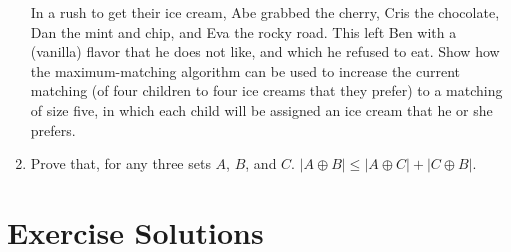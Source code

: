 \documentclass [12pt]{article}
\theoremstyle{definition}
\begin{document}
\begin{enumerate}
\vspace{0.25in}
In a rush to get their ice cream, Abe grabbed the cherry, Cris the chocolate, Dan the mint and chip, and 
Eva the rocky road. This left Ben with a (vanilla) flavor that he does not like, and which he refused to eat.
Show how the maximum-matching algorithm can be used to increase the current matching (of four children to four
ice creams that they prefer) to a matching of size five, in which each child will be assigned an ice cream that
he or she prefers.

\item Prove that, for any three sets $A$, $B$, and $C$. $|A\oplus B|\leq |A\oplus C| + |C\oplus B|$.





\end{enumerate}

\newpage
\newpage
\section*{Exercise Solutions}
\end{document}
